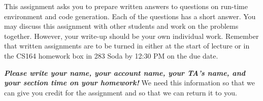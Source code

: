 \documentclass{article}
\begin{document}

This assignment asks you to prepare written answers to questions on
run-time environment and code generation. Each of the questions has a short answer. You
may discuss this assignment with other students and work on the
problems together.  However, your write-up should be your own
individual work.  Remember that written assignments are to be turned
in either at the start of lecture or in the CS164 homework box in 283
Soda by 12:30 PM on the due date.

\medskip

{\bf\em Please write your name, your account name, your TA's name, and
your section time on your homework!}  We need this information so that we
can give you credit for the assignment and so that we can return it to
you.

\bigskip
\end{document}
